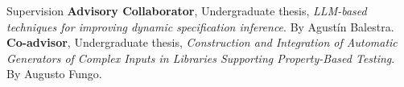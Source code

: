 \begin{rubric}{Supervision}
    \entry*[2025 -- Present] 
        \textbf{Advisory Collaborator}, Undergraduate thesis, 
        \newline \textit{LLM-based techniques for improving dynamic specification inference}. 
        \newline By Agustín Balestra.
    \entry*[2024 -- 2025] 
        \textbf{Co-advisor}, Undergraduate thesis,
        \newline \textit{Construction and Integration of Automatic Generators of Complex Inputs in Libraries Supporting Property-Based Testing}. 
        \newline By Augusto Fungo.
\end{rubric}